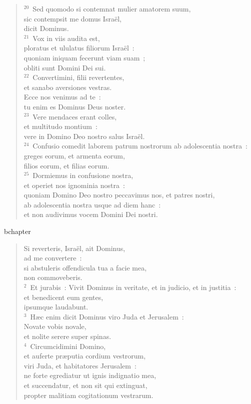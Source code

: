 \begin{verse}
${}^{20}$~Sed quomodo si contemnat mulier amatorem suum,\\ sic contempsit me domus Isra\"el,\\ dicit Dominus.\\
${}^{21}$~Vox in viis audita est,\\ ploratus et ululatus filiorum Isra\"el~:\\ quoniam iniquam fecerunt viam suam~;\\ obliti sunt Domini Dei sui.\\
${}^{22}$~Convertimini, filii revertentes,\\ et sanabo aversiones vestras.\\ Ecce nos venimus ad te~:\\ tu enim es Dominus Deus noster.\\
${}^{23}$~Vere mendaces erant colles,\\ et multitudo montium~:\\ vere in Domino Deo nostro salus Isra\"el.\\
${}^{24}$~Confusio comedit laborem patrum nostrorum ab adolescentia nostra~:\\ greges eorum, et armenta eorum,\\ filios eorum, et filias eorum.\\
${}^{25}$~Dormiemus in confusione nostra,\\ et operiet nos ignominia nostra~:\\ quoniam Domino Deo nostro peccavimus nos, et patres nostri,\\ ab adolescentia nostra usque ad diem hanc~:\\ et non audivimus vocem Domini Dei nostri.\end{verse}


bchapter\begin{verse}\vspace{-19pt}Si reverteris, Isra\"el, ait Dominus,\\ ad me convertere~:\\ si abstuleris offendicula tua a facie mea,\\ non commoveberis.\\
${}^{2}$~Et jurabis~: Vivit Dominus in veritate, et in judicio, et in justitia~:\\ et benedicent eum gentes,\\ ipsumque laudabunt.\\
${}^{3}$~H\ae c enim dicit Dominus viro Juda et Jerusalem~:\\ Novate vobis novale,\\ et nolite serere super spinas.\\
${}^{4}$~Circumcidimini Domino,\\ et auferte pr\ae putia cordium vestrorum,\\ viri Juda, et habitatores Jerusalem~:\\ ne forte egrediatur ut ignis indignatio mea,\\ et succendatur, et non sit qui extinguat,\\ propter malitiam cogitationum vestrarum.\end{verse}


